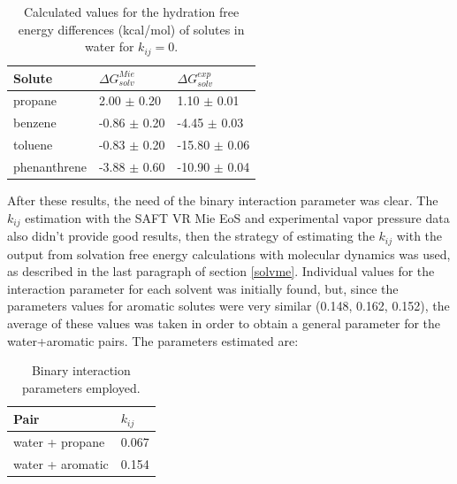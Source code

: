 \FloatBarrier
\begin{table}[h]
	\centering
	\caption{Calculated values for the hydration free energy differences (kcal/mol) of solutes in water for $k_{ij}=0$.}
	\label{tbl:solv3}
	\begin{tabular}{lll}
		\hline
		Solute & $\Delta G_{solv}^{Mie}$ & $\Delta G_{solv}^{exp}$ \\
		\hline
		propane   & 2.00 $\pm$ 0.20&1.10 $\pm$ 0.01   \\
		benzene  & -0.86 $\pm$ 0.20 & -4.45 $\pm$ 0.03   \\
		toluene  & -0.83 $\pm$ 0.20 &-15.80 $\pm$ 0.06   \\
		phenanthrene & -3.88 $\pm$ 0.60 &-10.90 $\pm$ 0.04   \\
		\hline
	\end{tabular}
\end{table}
\FloatBarrier

After these results, the need of  the binary interaction parameter was clear. The $k_{ij}$ estimation with the SAFT VR Mie EoS and experimental vapor pressure data also didn't provide good results, then the strategy of estimating the $k_{ij}$ with the output from solvation free energy calculations with molecular dynamics was used, as described in the last paragraph of section \ref{solvme}.  Individual values for the interaction parameter for each solvent was initially found, but, since the parameters values for aromatic solutes were very similar (0.148, 0.162, 0.152), the average of these values was taken in order to obtain a general parameter for the water+aromatic pairs. The parameters estimated are:

\begin{table}[h]
  \centering
  \caption{Binary interaction parameters employed.}
  \label{tbl:kij}
  \begin{tabular}{ll}
    \hline
      Pair & $k_{ij}$ \\
    \hline
    water  + propane      & 0.067  \\
    water  + aromatic      & 0.154 \\  
    \hline
  \end{tabular}
\end{table}

